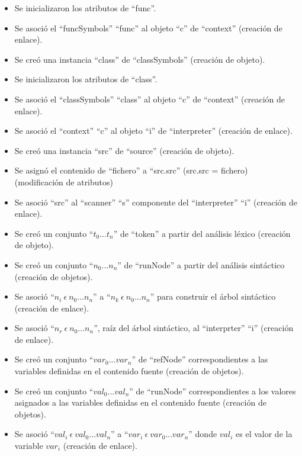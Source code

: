 \begin{description}
\begin {itemize}
         \item Se inicializaron los atributos de ``func''.
         \item Se asoció el ``funcSymbols'' ``func'' al objeto ``c'' de ``context'' (creación de enlace).
         \item Se creó una instancia ``class'' de ``classSymbols'' (creación de objeto).
         \item Se inicializaron los atributos de ``class''.
         \item Se asoció el ``classSymbols'' ``class'' al objeto ``c'' de ``context'' (creación de enlace).
         \item Se asoció el ``context'' ``c'' al objeto ``i'' de ``interpreter'' (creación de enlace).
      
      
         \item Se creó una instancia ``src'' de ``source'' (creación de objeto).
         \item Se asignó el contenido de ``fichero'' a ``src.src'' (src.src = fichero) (modificación de atributos)
         \item Se asoció ``src'' al ``scanner'' ``s'' componente del ``interpreter'' ``i'' (creación de enlace). 
         \item Se creó un conjunto ``$t_0...t_n$'' de ``token'' a partir del análisis léxico (creación de objeto).
         \item Se creó un conjunto ``$n_0...n_n$'' de ``runNode'' a partir del análisis sintáctico (creación de objetos).
         \item Se asoció ``$n_i\ \epsilon\ n_0...n_n$'' a ``$n_k\ \epsilon\ n_0...n_n$'' para construir el árbol sintáctico (creación de enlace).
         \item Se asoció  ``$n_r\ \epsilon\ n_0...n_n$'', raíz del árbol sintáctico, al ``interprter'' ``i'' (creación de enlace).
         \item Se creó un conjunto ``$var_0...var_n$'' de ``refNode'' correspondientes a las variables definidas en el contenido fuente (creación de objetos).
         \item Se creó un conjunto ``$val_0...val_n$'' de ``runNode'' correspondientes a los valores asignados a las variables definidas en el contenido fuente (creación de objetos).
         \item Se asoció ``$val_i\ \epsilon\ val_0...val_n$'' a  ``$var_i\ \epsilon\ var_0...var_n$'' donde $val_i$ es el valor de la variable $var_i$ (creación de enlace). 

\end{itemize}
\end{description}

